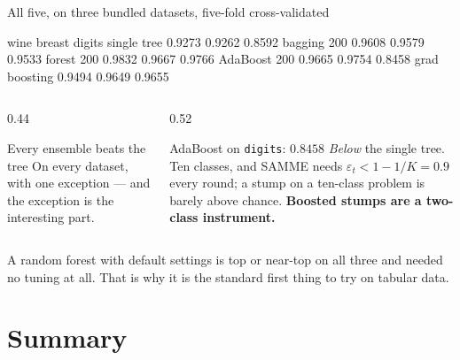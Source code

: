 \documentclass[aspectratio=169]{beamer}
\begin{document}
\begin{frame}[fragile,shrink=6]{All five, on three bundled datasets, five-fold cross-validated}
\begin{outblk}
                      wine     breast     digits
single tree         0.9273     0.9262     0.8592
bagging 200         0.9608     0.9579     0.9533
forest 200          0.9832     0.9667     0.9766
AdaBoost 200        0.9665     0.9754     0.8458
grad boosting       0.9494     0.9649     0.9655
\end{outblk}
  \begin{columns}[T]
    \begin{column}{0.44\textwidth}
      \begin{block}{Every ensemble beats the tree}
        On every dataset, with one exception --- and the exception is the
        interesting part.
      \end{block}
    \end{column}
    \begin{column}{0.52\textwidth}
      \begin{alertblock}{AdaBoost on \texttt{digits}: $0.8458$}
        \emph{Below} the single tree. Ten classes, and SAMME needs
        $\varepsilon_t < 1 - 1/K = 0.9$ every round; a stump on a
        ten-class problem is barely above chance. \textbf{Boosted stumps
        are a two-class instrument.}
      \end{alertblock}
    \end{column}
  \end{columns}
  \begin{center}\small
    A random forest with default settings is top or near-top on all three and
    needed no tuning at all. That is why it is the standard first thing to try
    on tabular data.
  \end{center}
\end{frame}

\section{Summary}
\label{sec:summary}
\end{document}
